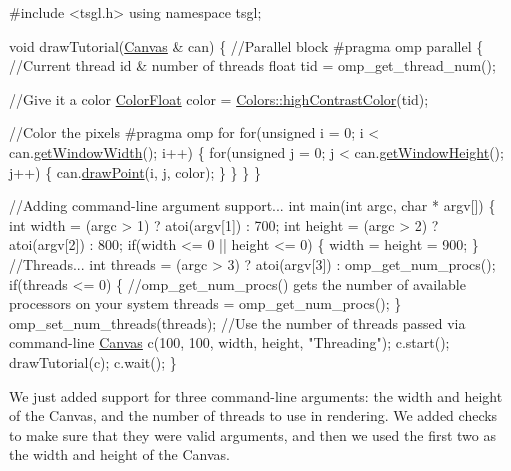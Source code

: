 \begin{DoxyCode}
\textcolor{preprocessor}{#include <tsgl.h>}
\textcolor{keyword}{using namespace }tsgl;

\textcolor{keywordtype}{void} drawTutorial(\hyperlink{classtsgl_1_1_canvas}{Canvas} & can) \{
  \textcolor{comment}{//Parallel block}
\textcolor{preprocessor}{  #pragma omp parallel}
\textcolor{preprocessor}{}  \{
    \textcolor{comment}{//Current thread id & number of threads}
    \textcolor{keywordtype}{float} tid = omp\_get\_thread\_num();

    \textcolor{comment}{//Give it a color}
    \hyperlink{structtsgl_1_1_color_float}{ColorFloat} color = \hyperlink{classtsgl_1_1_colors_a93d3fc815542e586dbc1ecf3e984e0b6}{Colors::highContrastColor}(tid);

    \textcolor{comment}{//Color the pixels}
\textcolor{preprocessor}{    #pragma omp for}
\textcolor{preprocessor}{}    \textcolor{keywordflow}{for}(\textcolor{keywordtype}{unsigned} i = 0; i < can.\hyperlink{classtsgl_1_1_canvas_a086a0322f4a6ab27da6929b1aa0593af}{getWindowWidth}(); i++) \{
        \textcolor{keywordflow}{for}(\textcolor{keywordtype}{unsigned} j = 0; j < can.\hyperlink{classtsgl_1_1_canvas_ad740ebe5d6bd69ab79cde3e84f369f35}{getWindowHeight}(); j++) \{
            can.\hyperlink{classtsgl_1_1_canvas_a6c17c90cd13f7b0184a25e4acc2b7426}{drawPoint}(i, j, color);
          \}
    \}
  \}
\}

\textcolor{comment}{//Adding command-line argument support...}
\textcolor{keywordtype}{int} main(\textcolor{keywordtype}{int} argc, \textcolor{keywordtype}{char} * argv[]) \{
  \textcolor{keywordtype}{int} width = (argc > 1) ? atoi(argv[1]) : 700;
  \textcolor{keywordtype}{int} height = (argc > 2) ? atoi(argv[2]) : 800;
  \textcolor{keywordflow}{if}(width <= 0 || height <= 0) \{
    width = height = 900;
  \}
  \textcolor{comment}{//Threads...}
  \textcolor{keywordtype}{int} threads = (argc > 3) ? atoi(argv[3]) : omp\_get\_num\_procs();
  \textcolor{keywordflow}{if}(threads <= 0) \{
    \textcolor{comment}{//omp\_get\_num\_procs() gets the number of available processors on your system}
    threads = omp\_get\_num\_procs();
  \}
  omp\_set\_num\_threads(threads); \textcolor{comment}{//Use the number of threads passed via command-line}
  \hyperlink{classtsgl_1_1_canvas}{Canvas} c(100, 100, width, height, \textcolor{stringliteral}{"Threading"});
  c.start();
  drawTutorial(c);
  c.wait();
\}
\end{DoxyCode}


We just added support for three command-\/line arguments\-: the width and height of the Canvas, and the number of threads to use in rendering. We added checks to make sure that they were valid arguments, and then we used the first two as the width and height of the Canvas.


